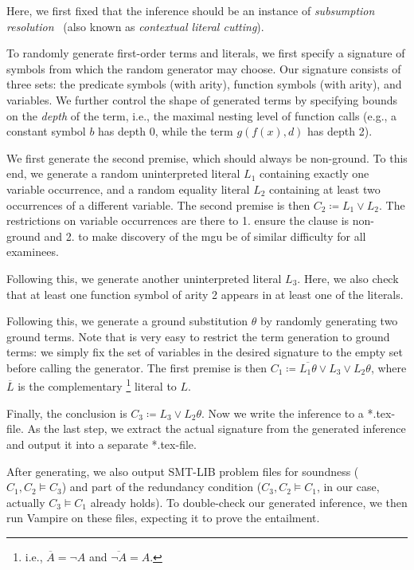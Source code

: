 Here, we first fixed that the inference
should be an instance of \emph{subsumption resolution}~\cite{Vampire13}
(also known as \emph{contextual literal cutting}).

To randomly generate first-order terms and literals,
we first specify a signature of symbols from which the random generator may choose.
Our signature consists of three sets:
the predicate symbols (with arity),
function symbols (with arity),
and variables.
We further control the shape of generated terms
by specifying bounds on the \emph{depth} of the term,
i.e., the maximal nesting level of function calls
(e.g., a constant symbol $b$ has depth 0, while the term $g(f(x),d)$ has depth 2).

We first generate the second premise, which should always be non-ground.
To this end, we generate a random uninterpreted literal $L_1$ containing exactly one variable occurrence,
and a random equality literal $L_2$ containing at least two occurrences of a different variable.
The second premise is then $C_2 \coloneqq L_1 \lor L_2$.
The restrictions on variable occurrences are there to 1. ensure the clause is non-ground
and 2. to make discovery of the mgu be of similar difficulty for all examinees.

Following this, we generate another uninterpreted literal $L_3$.
Here, we also check that at least one function symbol of arity 2 appears in at least one of the literals.

Following this, we generate a ground substitution $\theta$ by randomly generating two ground terms.
Note that is very easy to restrict the term generation to ground terms:
we simply fix the set of variables in the desired signature to the empty set before calling the generator.
The first premise is then $C_1 \coloneqq \overline{L_1\theta} \lor L_3 \lor L_2\theta$,
where $\overline{L}$ is the complementary%
\footnote{i.e., $\overline{A} = \lnot A$ and $\overline{\lnot A} = A$.}
literal to $L$.

Finally, the conclusion is $C_3 \coloneqq L_3 \lor L_2\theta$.
Now we write the inference to a *.tex-file.
As the last step,
we extract the actual signature from the generated inference and output it into a separate *.tex-file.

After generating, we also output SMT-LIB problem files for
soundness ($C_1, C_2 \models C_3$)
and part of the redundancy condition
($C_3, C_2 \models C_1$, in our case, actually $C_3 \models C_1$ already holds).
To double-check our generated inference, we then run Vampire on these files,
expecting it to prove the entailment.
